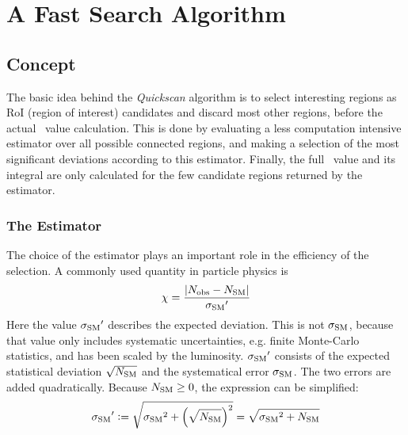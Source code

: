 
\chapter{A Fast Search Algorithm}

\section{Concept}
The basic idea behind the \emph{Quickscan} algorithm is to select interesting regions as RoI (region of interest) candidates and discard most other regions, before the actual \p~value calculation.
This is done by evaluating a less computation intensive estimator over all possible connected regions, and making a selection of the most significant deviations according to this estimator. Finally, the full \p~value and its integral are only calculated for the few candidate regions returned by the estimator.


\subsection{The Estimator}
The choice of the estimator plays an important role in the efficiency of the selection. A commonly used quantity in particle physics is 
\begin{equation}
\chi = \frac{|{N_\mathrm{obs}} - {N_\mathrm{SM}}|}{{\sigma_\mathrm{SM}}'}
\end{equation}
Here the value ${\sigma_\mathrm{SM}}'$ describes the expected deviation. This is not ${\sigma_\mathrm{SM}}$, because that value only includes systematic uncertainties, e.g. finite Monte-Carlo statistics, and has been scaled by the luminosity.
${\sigma_\mathrm{SM}}'$ consists of the expected statistical deviation $\sqrt{{N_\mathrm{SM}}}$ and the systematical error ${\sigma_\mathrm{SM}}$. The two errors are added quadratically. Because ${N_\mathrm{SM}} \geq 0$, the expression can be simplified:
\begin{equation}
{\sigma_\mathrm{SM}}' \vcentcolon= \sqrt{{\sigma_\mathrm{SM}}^2 + \left(\sqrt{{N_\mathrm{SM}}}\right)^2} = \sqrt{{\sigma_\mathrm{SM}}^2 + {N_\mathrm{SM}}}
\end{equation}

